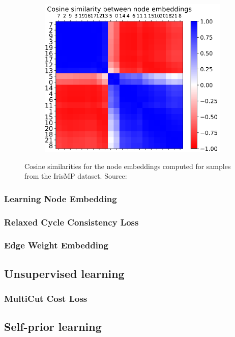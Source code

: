 \documentclass{beamer}
\begin{document}
\begin{frame}
\begin{figure}
\begin{subfigure}{0.5\linewidth}
        \end{subfigure}
        \begin{subfigure}{0.49\linewidth}
            \centering
            \includegraphics[height=0.53\textwidth]{emb4.png}
        \end{subfigure}
        \caption{Cosine similarities for the node embeddings
            computed for samples from the IrisMP dataset.
            Source: \cite{jung2022learning}}
    \end{figure}

\end{frame}

\begin{frame}
    \frametitle{Learning Node Embedding}



\end{frame}

\begin{frame}
    \frametitle{Relaxed Cycle Consistency Loss}

\end{frame}

\begin{frame}
    \frametitle{Edge Weight Embedding}



\end{frame}

\subsection{Unsupervised learning}

\begin{frame}
    \frametitle{MultiCut Cost Loss}

\end{frame}

\subsection{Self-prior learning}
\end{document}
